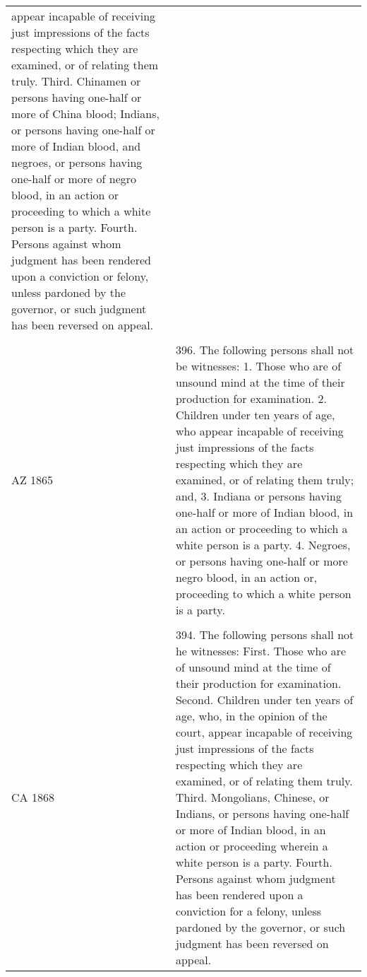 \documentclass[12pt,]{article}
\begin{document}
\begin{longtable}[]{@{}ll@{}}
\begin{minipage}[t]{0.77\columnwidth}
appear incapable of receiving just impressions of the facts respecting
which they are examined, or of relating them truly. Third. Chinamen or
persons having one-half or more of China blood; Indians, or persons
having one-half or more of Indian blood, and negroes, or persons having
one-half or more of negro blood, in an action or proceeding to which a
white person is a party. Fourth. Persons against whom judgment has been
rendered upon a conviction or felony, unless pardoned by the governor,
or such judgment has been reversed on appeal.\strut
\end{minipage}\tabularnewline
\begin{minipage}[t]{0.17\columnwidth}\raggedright
\strut
\end{minipage} & \begin{minipage}[t]{0.77\columnwidth}\raggedright
\strut
\end{minipage}\tabularnewline
\begin{minipage}[t]{0.17\columnwidth}\raggedright
AZ 1865\strut
\end{minipage} & \begin{minipage}[t]{0.77\columnwidth}\raggedright
396. The following persons shall not be witnesses: 1. Those who are of
unsound mind at the time of their production for examination. 2.
Children under ten years of age, who appear incapable of receiving just
impressions of the facts respecting which they are examined, or of
relating them truly; and, 3. Indiana or persons having one-half or more
of Indian blood, in an action or proceeding to which a white person is a
party. 4. Negroes, or persons having one-half or more negro blood, in an
action or, proceeding to which a white person is a party.\strut
\end{minipage}\tabularnewline
\begin{minipage}[t]{0.17\columnwidth}\raggedright
\strut
\end{minipage} & \begin{minipage}[t]{0.77\columnwidth}\raggedright
\strut
\end{minipage}\tabularnewline
\begin{minipage}[t]{0.17\columnwidth}\raggedright
CA 1868\strut
\end{minipage} & \begin{minipage}[t]{0.77\columnwidth}\raggedright
394. The following persons shall not he witnesses: First. Those who are
of unsound mind at the time of their production for examination. Second.
Children under ten years of age, who, in the opinion of the court,
appear incapable of receiving just impressions of the facts respecting
which they are examined, or of relating them truly. Third. Mongolians,
Chinese, or Indians, or persons having one-half or more of Indian blood,
in an action or proceeding wherein a white person is a party. Fourth.
Persons against whom judgment has been rendered upon a conviction for a
felony, unless pardoned by the governor, or such judgment has been
reversed on appeal.\strut
\end{minipage}\tabularnewline
\bottomrule
\end{longtable}
\end{document}
